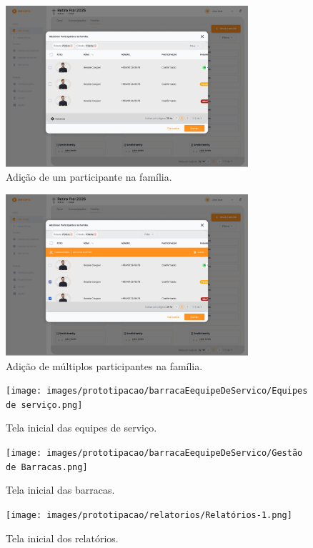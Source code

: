 \begin{figure}[H]
\centering
\includegraphics[width=0.8\textwidth]{images/prototipacao/familia/Familias-1.png}
\caption{Adição de um participante na família.}
\end{figure}

\begin{figure}[H]
\centering
\includegraphics[width=0.8\textwidth]{images/prototipacao/familia/Familias.png}
\caption{Adição de múltiplos participantes na família.}
\end{figure}

\begin{figure}[H]
\centering
\texttt{[image: images/prototipacao/barracaEequipeDeServico/Equipes de serviço.png]}
\caption{Tela inicial das equipes de serviço.}
\end{figure}

\begin{figure}[H]
\centering
\texttt{[image: images/prototipacao/barracaEequipeDeServico/Gestão de Barracas.png]}
\caption{Tela inicial das barracas.}
\end{figure}

\begin{figure}[H]
\centering
\texttt{[image: images/prototipacao/relatorios/Relatórios-1.png]}
\caption{Tela inicial dos relatórios.}
\end{figure}

